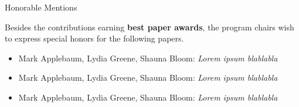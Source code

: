 {\Large Honorable Mentions}

Besides the contributions earning \textbf{best paper awards}, the program chairs wish to express special honors for the following papers.

\begin{itemize}
\item Mark Applebaum, Lydia Greene, Shauna Bloom: \textit{Lorem ipsum blablabla}
\item Mark Applebaum, Lydia Greene, Shauna Bloom: \textit{Lorem ipsum blablabla}
\item Mark Applebaum, Lydia Greene, Shauna Bloom: \textit{Lorem ipsum blablabla}
\end{itemize}